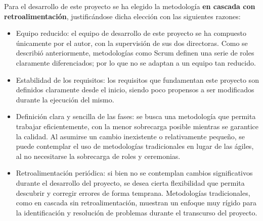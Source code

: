     Para el desarrollo de este proyecto se ha elegido la metodología \textbf{en cascada con retroalimentación}, justificándose dicha elección con las siguientes razones:
    
    \begin{itemize}
        \item Equipo reducido: el equipo de desarrollo de este proyecto se ha compuesto únicamente por el autor, con la supervisión de sus dos directoras. Como se describió anteriormente, metodologías como Scrum definen una serie de roles claramente diferenciados; por lo que no se adaptan a un equipo tan reducido.
        \item Estabilidad de los requisitos: los requisitos que fundamentan este proyecto son definidos claramente desde el inicio, siendo poco propensos a ser modificados durante la ejecución del mismo. 
        \item Definición clara y sencilla de las fases: se busca una metodología que permita trabajar eficientemente, con la menor sobrecarga posible mientras se garantice la calidad. Al asumirse un cambio inexistente o relativamente pequeño, se puede contemplar el uso de metodologías tradicionales en lugar de las ágiles, al no necesitarse la sobrecarga de roles y ceremonias. 
        \item Retroalimentación periódica: si bien no se contemplan cambios significativos durante el desarrollo del proyecto, se desea cierta flexibilidad que permita descubrir y corregir errores de forma temprana. Metodologías tradicionales, como en cascada sin retroalimentación, muestran un enfoque muy rígido para la identificación y resolución de problemas durante el transcurso del proyecto.
    \end{itemize}